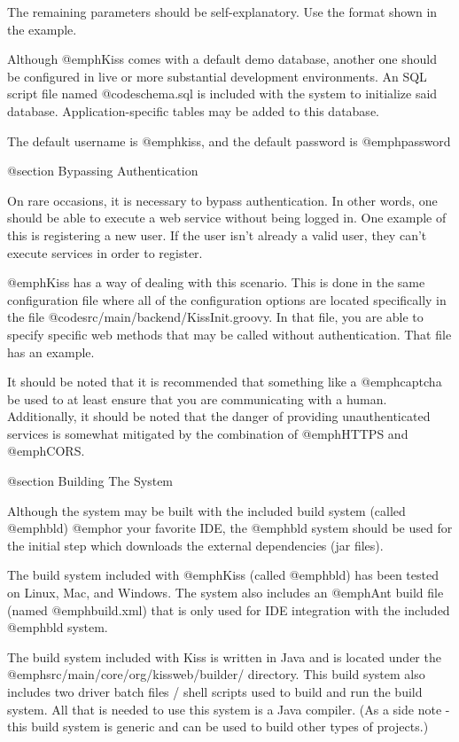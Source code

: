 The remaining parameters should be self-explanatory.  Use the format
shown in the example.

Although @emph{Kiss} comes with a default demo database, another one
should be configured in live or more substantial development
environments.  An SQL script file named @code{schema.sql} is included
with the system to initialize said database.  Application-specific tables
may be added to this database.

The default username is @emph{kiss}, and the default password is
@emph{password}

@section Bypassing Authentication

On rare occasions, it is necessary to bypass authentication.  In other
words, one should be able to execute a web service without being logged in.  One
example of this is registering a new user.  If the user isn't already a
valid user, they can't execute services in order to register.

@emph{Kiss} has a way of dealing with this scenario.  This is done in
the same configuration file where all of the configuration options are
located specifically in the file @code{src/main/backend/KissInit.groovy}.  In
that file, you are able to specify specific web methods that may be
called without authentication.  That file has an example.

It should be noted that it is recommended that something like a
@emph{captcha} be used to at least ensure that you are
communicating with a human.  Additionally, it should be noted that the
danger of providing unauthenticated services is somewhat mitigated by
the combination of @emph{HTTPS} and @emph{CORS}.

@section Building The System

Although the system may be built with the included build system
(called @emph{bld}) @emph{or} your favorite IDE, the @emph{bld}
system should be used for the initial step which downloads the external
dependencies (jar files).

The build system included with @emph{Kiss} (called @emph{bld}) has
been tested on Linux, Mac, and Windows.  The system also includes an
@emph{Ant} build file (named @emph{build.xml}) that is only used for
IDE integration with the included @emph{bld} system.

The build system included with Kiss is written in Java and is located
under the @emph{src/main/core/org/kissweb/builder/} directory.  This
build system also includes two driver batch files / shell scripts used
to build and run the build system.  All that is needed to use this
system is a Java compiler.  (As a side note - this build system is
generic and can be used to build other types of projects.)

